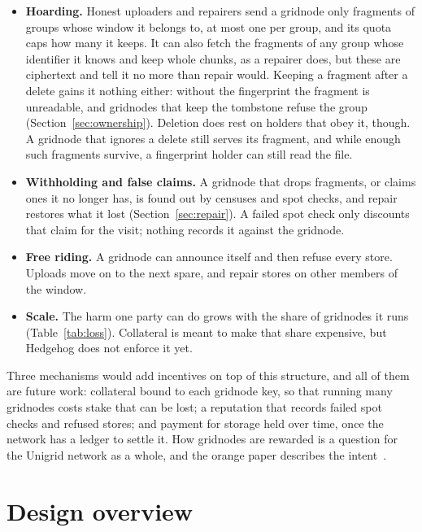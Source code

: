 \documentclass[10pt,a4paper,final]{article}
\begin{document}
\begin{itemize}
	\item \textbf{Hoarding.} Honest uploaders and repairers send a gridnode only fragments of groups whose window it
	      belongs to, at most one per group, and its quota caps how many it keeps. It can also fetch the fragments of
	      any group whose identifier it knows and keep whole chunks, as a repairer does, but these are ciphertext and
	      tell it no more than repair would. Keeping a fragment after a delete gains it nothing either: without the
	      fingerprint the fragment is unreadable, and gridnodes that keep the tombstone refuse the group
	      (Section~\ref{sec:ownership}). Deletion does rest on holders that obey it, though. A gridnode that
	      ignores a delete still serves its fragment, and while enough such fragments survive, a fingerprint holder
	      can still read the file.
	\item \textbf{Withholding and false claims.} A gridnode that drops fragments, or claims ones it no longer has, is
	      found out by censuses and spot checks, and repair restores what it lost (Section~\ref{sec:repair}). A failed
	      spot check only discounts that claim for the visit; nothing records it against the gridnode.
	\item \textbf{Free riding.} A gridnode can announce itself and then refuse every store. Uploads move on to the
	      next spare, and repair stores on other members of the window.
	\item \textbf{Scale.} The harm one party can do grows with the share of gridnodes it runs
	      (Table~\ref{tab:loss}). Collateral is meant to make that share expensive, but Hedgehog does not enforce it
	      yet.
\end{itemize}

Three mechanisms would add incentives on top of this structure, and all of them are future work: collateral bound to
each gridnode key, so that running many gridnodes costs stake that can be lost; a reputation that records failed
spot checks and refused stores; and payment for storage held over time, once the network has a ledger to settle it.
How gridnodes are rewarded is a question for the Unigrid network as a whole, and the orange paper describes the
intent~\cite{unigrid-orangepaper}.

\section{Design overview}
\label{sec:overview}
\end{document}
